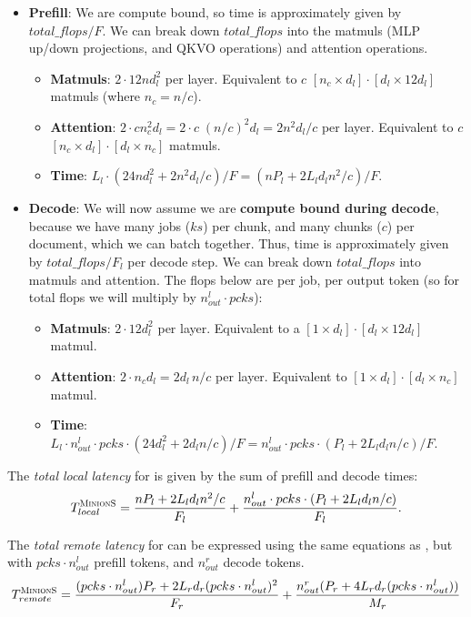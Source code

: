\begin{itemize}
    \item \textbf{Prefill}: We are compute bound, so time is approximately given by $total\_flops / F$. We can break down $total\_flops$ into the matmuls (MLP up/down projections, and QKVO operations) and attention operations.
    \begin{itemize}
        \item \textbf{Matmuls}: $2 \cdot 12 n d_l^2$ per layer. Equivalent to $c$ $[n_c \times d_l] \cdot [d_l \times 12d_l]$ matmuls (where $n_c = n/c$).
        \item \textbf{Attention}: $2 \cdot c n_c^2 d_l = 2 \cdot c \; (n/c)^2 d_l = 2n^2 d_l / c$ per layer.  Equivalent to $c$ $[n_c \times d_l] \cdot [d_l \times n_c]$ matmuls.
        \item \textbf{Time}: $L_l \cdot (24 n d_l^2 + 2 n^2 d_l / c) / F = (n P_l + 2 L_l d_l n^2 /c) / F$.
    \end{itemize}
    \item \textbf{Decode}: We will now assume we are \textbf{compute bound during decode}, because we have many jobs ($ks$) per chunk, and many chunks ($c$) per document, which we can batch together. Thus, time is approximately given by $total\_flops / F_l$ per decode step. We can break down $total\_flops$ into matmuls and attention. The flops below are per job, per output token (so for total flops we will multiply by $n_{out}^l \cdot pcks$):
    \begin{itemize}
        \item \textbf{Matmuls}: $2 \cdot 12 d_l^2$ per layer. Equivalent to a $[1 \times d_l] \cdot [d_l \times 12d_l]$ matmul.
        \item \textbf{Attention}: $2 \cdot n_c d_l = 2d_l \, n/c$ per layer. Equivalent to $[1 \times d_l] \cdot [d_l \times n_c]$ matmul.
        \item \textbf{Time}: $L_l \cdot n_{out}^l \cdot pcks \cdot (24 d_l^2 + 2 d_l n/c) / F = n_{out}^l \cdot pcks \cdot (P_l + 2 L_l d_l n/c) / F$.
    \end{itemize}
\end{itemize}
The \textit{total local latency} for \system is given by the sum of prefill and decode times: 
\systemmath
$$T_{local}^{\textsc{MinionS}} = \frac{n P_l + 2 L_l d_l n^2 /c}{F_l} + \frac{n_{out}^l \cdot pcks \cdot (P_l + 2 L_l d_l n/c)}{F_l}.$$

The \textit{total remote latency} for \system can be expressed using the same equations as \naive, but with $pcks \cdot n_{out}^l$ prefill tokens, and $n_{out}^r$ decode tokens.
$$T_{remote}^{\textsc{MinionS}} = \frac{(pcks \cdot n_{out}^l) P_r + 2 L_r d_r (pcks \cdot n_{out}^l)^2}{F_r} + \frac{n_{out}^r (P_r + 4 L_r d_r (pcks \cdot n_{out}^l) )}{M_r}$$


